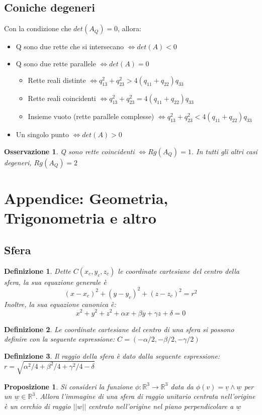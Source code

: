 \documentclass[12pt]{article}
\newenvironment{para}{\begin{adjustwidth}{13mm}{}}{\end{adjustwidth}}
\newtheorem{Definizione}{Definizione}[subsection]
\newtheorem{Proposizione}{Proposizione}[subsection]
\newtheorem{Osservazione}{Osservazione}[subsection]
\begin{document}
\begin{para}
\subsection{Coniche degeneri}
Con la condizione che $det(A_Q) = 0$, allora:
\begin{itemize}
    \item Q sono due rette che si intersecano $\Leftrightarrow det(A)<0$
    \item Q sono due rette parallele $\Leftrightarrow det(A)=0$
    \begin{itemize}
        \item Rette reali distinte $\Leftrightarrow q_{13}^2+q_{23}^2 > 4(q_{11}+q_{22})q_{33}$
        \item Rette reali coincidenti $\Leftrightarrow q_{13}^2+q_{23}^2 = 4(q_{11}+q_{22})q_{33}$
        \item Insieme vuoto (rette parallele complesse) $\Leftrightarrow q_{13}^2+q_{23}^2 < 4(q_{11}+q_{22})q_{33}$
    \end{itemize}
    \item Un singolo punto $\Leftrightarrow det(A) > 0$
\end{itemize}
\begin{Osservazione}
    Q sono rette coincidenti $\Leftrightarrow Rg(A_Q)=1$. In tutti gli altri casi degeneri, $Rg(A_Q) = 2$
\end{Osservazione}
\section{Appendice: Geometria, Trigonometria e altro}
\subsection{Sfera}
\begin{Definizione}
    Dette $C(x_c, y_c, z_c)$ le coordinate cartesiane del centro della sfera, la sua equazione generale è $$(x-x_c)^2+(y-y_c)^2+(z-z_c)^2 = r^2$$
Inoltre, la sua equazione canonica è:
$$x^2+y^2+z^2+\alpha x + \beta y + \gamma z + \delta = 0$$
\end{Definizione}
\begin{Definizione}
    Le coordinate cartesiane del centro di una sfera si possono definire con la seguente espressione: $C = (-\alpha/2, -\beta/2, -\gamma/2)$
\end{Definizione}
\begin{Definizione}
    Il raggio della sfera è dato dalla seguente espressione: \newline $r = \sqrt{\alpha^2/4 + \beta^2/4 + \gamma^2/4 - \delta}$
\end{Definizione}
\begin{Proposizione}
    Si consideri la funzione $\phi: \mathbb{R}^3 \rightarrow \mathbb{R}^3$ data da $\phi(v) = \underline{v} \land \underline{w}$ per un $\underline{w} \in \mathbb{R}^3$. Allora l'immagine di una sfera di raggio unitario centrata nell'origine è un cerchio di raggio $\bigl||w|\bigr|$ centrato nell'origine nel piano perpendicolare a $\underline{w}$
\end{Proposizione}

\end{para}
\end{document}
